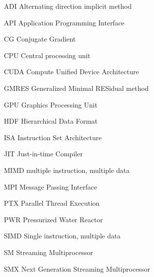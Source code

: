 \begin{denotation}

\item[ADI] Alternating direction implicit method
\item[API] Application Programming Interface
\item[CG] Conjugate Gradient
\item[CPU] Central processing unit
\item[CUDA] Compute Unified Device Architecture
\item[GMRES] Generalized Minimal RESidual method
\item[GPU] Graphics Processing Unit
\item[HDF] Hierarchical Data Format
\item[ISA] Instruction Set Architecture
\item[JIT] Just-in-time Compiler
\item[MIMD] multiple instruction, multiple data
\item[MPI] Message Passing Interface
\item[PTX] Parallel Thread Execution
\item[PWR] Pressurized Water Reactor
\item[\ProgramName] \ProgramFullName
\item[SIMD] Single instruction, multiple data
\item[SM] Streaming Multiprocessor
\item[SMX] Next Generation Streaming Multiprocessor

\end{denotation}
